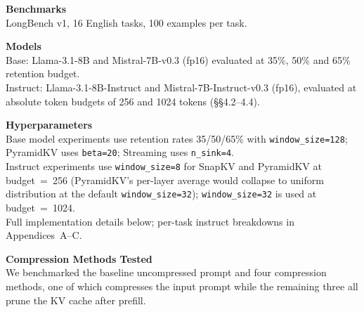 \documentclass[10pt,letterpaper]{article}
\begin{document}
\textbf{Benchmarks}
\\LongBench v1, 16 English tasks, 100 examples per task.

\textbf{Models}
\\Base: Llama-3.1-8B and Mistral-7B-v0.3 (fp16) evaluated at 35\%, 50\% and 65\% retention budget.
\\Instruct: Llama-3.1-8B-Instruct and Mistral-7B-Instruct-v0.3 (fp16), evaluated at absolute token budgets of 256 and 1024 tokens (§§4.2--4.4).

\textbf{Hyperparameters}
\\Base model experiments use retention rates 35/50/65\% with \texttt{window\_size=128}; PyramidKV uses \texttt{beta=20}; Streaming uses \texttt{n\_sink=4}.
\\Instruct experiments use \texttt{window\_size=8} for SnapKV and PyramidKV at budget~=~256 
(PyramidKV's per-layer average would collapse to uniform distribution at the default 
\texttt{window\_size=32}); \texttt{window\_size=32} is used at budget~=~1024.
\\Full implementation details below; per-task instruct breakdowns in Appendices~A--C.

\textbf{Compression Methods Tested}
\\We benchmarked the baseline uncompressed prompt and four  compression methods, 
one of which compresses the input prompt while the remaining three all prune the KV
cache after prefill.
\end{document}
